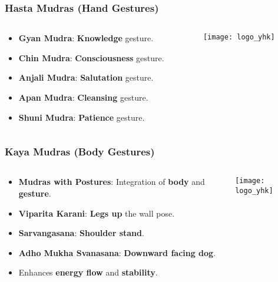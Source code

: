 \begin{frame}[fragile]\frametitle{Hasta Mudras (Hand Gestures)}
\begin{columns}
    \begin{column}[T]{0.5\linewidth}
      \begin{itemize}
        \item \textbf{Gyan Mudra}: \textbf{Knowledge} gesture.
        \item \textbf{Chin Mudra}: \textbf{Consciousness} gesture.
        \item \textbf{Anjali Mudra}: \textbf{Salutation} gesture.
        \item \textbf{Apan Mudra}: \textbf{Cleansing} gesture.
        \item \textbf{Shuni Mudra}: \textbf{Patience} gesture.
      \end{itemize}
    \end{column}
    \begin{column}[T]{0.5\linewidth}
        \begin{center}
        \texttt{[image: logo\_yhk]}
        \end{center}	
    \end{column}
\end{columns}
\end{frame}

\begin{frame}[fragile]\frametitle{Kaya Mudras (Body Gestures)}
\begin{columns}
    \begin{column}[T]{0.5\linewidth}
      \begin{itemize}
        \item \textbf{Mudras with Postures}: Integration of \textbf{body} and \textbf{gesture}.
        \item \textbf{Viparita Karani}: \textbf{Legs up} the wall pose.
        \item \textbf{Sarvangasana}: \textbf{Shoulder stand}.
        \item \textbf{Adho Mukha Svanasana}: \textbf{Downward facing dog}.
        \item Enhances \textbf{energy flow} and \textbf{stability}.
      \end{itemize}
    \end{column}
    \begin{column}[T]{0.5\linewidth}
        \begin{center}
        \texttt{[image: logo\_yhk]}
        \end{center}	
    \end{column}
\end{columns}
\end{frame}

